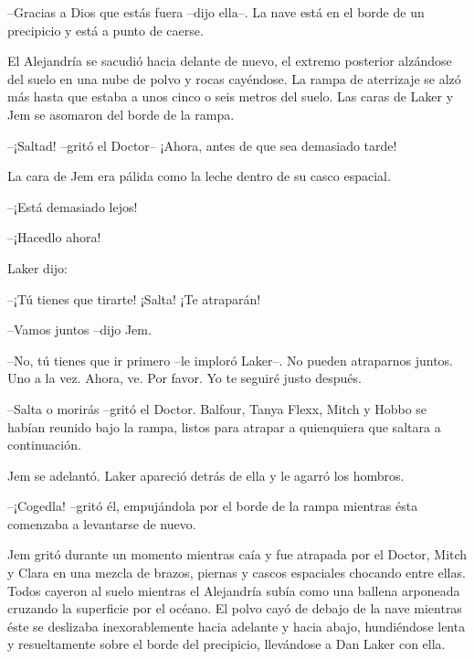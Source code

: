 {--Gracias a Dios que estás fuera --dijo ella--. La nave está en el borde
de un precipicio y está a punto de caerse.}

{El Alejandría se sacudió hacia delante de nuevo, el extremo posterior
 alzándose del suelo en una nube de polvo y rocas cayéndose. La rampa de
 aterrizaje se alzó más hasta que estaba a unos cinco o seis metros del
suelo. Las caras de Laker y Jem se asomaron del borde de la rampa.}

{--¡Saltad! --gritó el Doctor-- ¡Ahora, antes de que sea demasiado
tarde!}

{La cara de Jem era pálida como la leche dentro de su casco espacial.}

{--¡Está demasiado lejos!}

{--¡Hacedlo ahora!}

{Laker dijo:}

{--¡Tú tienes que tirarte! ¡Salta! ¡Te atraparán!}

{--Vamos juntos --dijo Jem.}

{--No, tú tienes que ir primero --le imploró Laker--. No pueden
 atraparnos juntos. Uno a la vez. Ahora, ve. Por favor. Yo te seguiré
justo después.}

{--Salta o morirás --gritó el Doctor. Balfour, Tanya Flexx, Mitch y Hobbo
 se habían reunido bajo la rampa, listos para atrapar a quienquiera que
saltara a continuación.}

{Jem se adelantó. Laker apareció detrás de ella y le agarró los
hombros.}

{--¡Cogedla! --gritó él, empujándola por el borde de la rampa mientras
ésta comenzaba a levantarse de nuevo.}

{Jem gritó durante un momento mientras caía y fue atrapada por el Doctor,
 Mitch y Clara en una mezcla de brazos, piernas y cascos espaciales
 chocando entre ellas. Todos cayeron al suelo mientras el Alejandría
 subía como una ballena arponeada cruzando la superficie por el océano.
 El polvo cayó de debajo de la nave mientras éste se deslizaba
 inexorablemente hacia adelante y hacia abajo, hundiéndose lenta y
 resueltamente sobre el borde del precipicio, llevándose a Dan Laker con
ella.}
